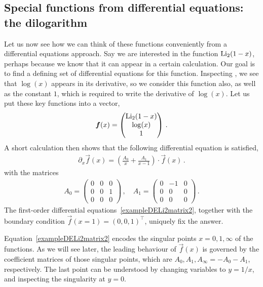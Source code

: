\subsection{Special functions from differential equations: the dilogarithm}
\label{sec:sepcialfunctionsfromDE}

Let us now see how we can think of these functions conveniently from a differential equations approach. 
Say we are interested in the function ${\rm Li}_{2}(1-x)$, perhaps because we know that it can appear in a certain calculation.
Our goal is to find a defining set of differential equations for this function. Inspecting , we see that $\log(x)$ appears in its derivative, so we consider this function also, as well as the constant $1$, which is required to write the derivative of $\log(x)$. 
Let us put these key functions into a vector,
\begin{align} \label{definitionfLi2}
\vec{f}(x)= \begin{pmatrix} {\rm Li}_{2}(1-x) \\ \log(x) \\ 1 \end{pmatrix}
\,.
 \end{align}
 A short calculation then shows that the following differential equation is satisfied,
  \begin{align} \label{exampleDELi2matrix2}
\partial_x \vec{f}(x)=  \left( \frac{A_0}{x}  +  \frac{A_1}{x-1} \right) \cdot \vec{f}(x)
\,.
 \end{align}
with the matrices
 \begin{align} \label{exampleDELi2matrix}
A_0 = {\begin{pmatrix}0 & 0 & 0 \\ 0 & 0 & 1 \\ 0 & 0 & 0 \end{pmatrix}}  \,, \quad  A_1 = {\begin{pmatrix}0 & -1 & 0 \\ 0 & 0 & 0 \\ 0 & 0 & 0 \end{pmatrix}}\,.
 \end{align}
The first-order differential equations~\eqref{exampleDELi2matrix2}, together with the boundary condition $\vec{f}(x=1) = (0,0,1)^{\top}$, uniquely fix the answer.

Equation~\eqref{exampleDELi2matrix2} encodes the singular points $x=0,1,\infty$ of the functions. As we will see later, the leading behaviour of $\vec{f}(x)$ is governed by the coefficient matrices of those singular points, which are $A_0,A_1,A_{\infty}=-A_0-A_1$, respectively.
The last point can be understood by changing variables to $y=1/x$, and inspecting the singularity at $y=0$.

